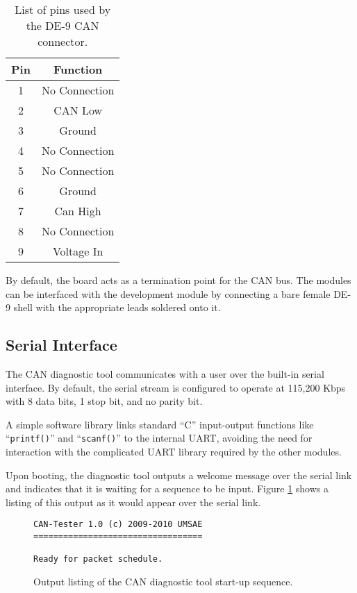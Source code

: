 \begin{table}[H]
  \caption{List of pins used by the DE-9 CAN connector.}
  \centering
  \begin{tabular}{|c|c|}
    \hline 
    Pin & Function \\
    \hline \hline
    1 & No Connection\\
    \hline    
    2 & CAN Low\\
    \hline    
    3 & Ground\\
    \hline    
    4 & No Connection\\
    \hline    
    5 & No Connection\\
    \hline    
    6 & Ground\\
    \hline    
    7 & Can High\\                 
    \hline    
    8 & No Connection\\
    \hline
    9 & Voltage In\\        
    \hline
  \end{tabular}
  \label{tbl:candt_pins}
\end{table}

By default, the board acts as a termination point for the CAN bus. The modules can be interfaced with the development module by connecting a bare female DE-9 shell with the appropriate leads soldered onto it. 

\subsection{Serial Interface}

The CAN diagnostic tool communicates with a user over the built-in serial interface. By default, the serial stream is configured to operate at 115,200 Kbps with 8 data bits, 1 stop bit, and no parity bit.

A simple software library links standard ``C'' input-output functions like ``\verb|printf()|'' and ``\verb|scanf()|'' to the internal UART, avoiding the need for interaction with the complicated UART library required by the other modules. 

Upon booting, the diagnostic tool outputs a welcome message over the serial link and indicates that it is waiting for a sequence to be input. Figure \ref{fig:candt_startup} shows a listing of this output as it would appear over the serial link.

\begin{figure}[H]
	\centering
	\makebox[\textwidth]{\hrulefill}
{\footnotesize	
	\begin{verbatim}
CAN-Tester 1.0 (c) 2009-2010 UMSAE
==================================

Ready for packet schedule.
	\end{verbatim}
}	
	\makebox[\textwidth]{\hrulefill}
	\caption{Output listing of the CAN diagnostic tool start-up sequence.}
	\label{fig:candt_startup}
\end{figure}

